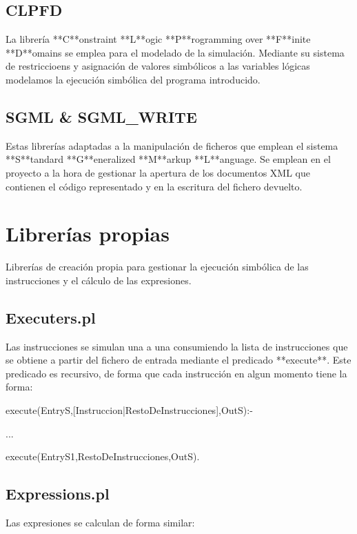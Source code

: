 \subsection*{CLPFD}

La librería **C**onstraint **L**ogic **P**rogramming over **F**inite **D**omains se emplea para el modelado de la simulación.
Mediante su sistema de restriccioens y asignación de valores simbólicos a las variables lógicas modelamos la ejecución simbólica del programa introducido.

\subsection*{SGML & SGML_WRITE}

Estas librerías adaptadas a la manipulación de ficheros que emplean el sistema **S**tandard **G**eneralized **M**arkup **L**anguage. 
Se emplean en el proyecto a la hora de gestionar la apertura de los documentos XML que contienen el código representado y en la escritura del fichero devuelto.

\section{Librerías propias}

Librerías de creación propia para gestionar la ejecución simbólica de las instrucciones y el cálculo de las expresiones.

\subsection*{Executers.pl}

Las instrucciones se simulan una a una consumiendo la lista de instrucciones que se obtiene a partir del fichero de entrada mediante el predicado **execute**. Este predicado es recursivo, de forma que cada instrucción en algun momento tiene la forma:

        execute(EntryS,[Instruccion|RestoDeInstrucciones],OutS):-
            
            ...
            
            execute(EntryS1,RestoDeInstrucciones,OutS).

\subsection*{Expressions.pl}

Las expresiones se calculan de forma similar:

